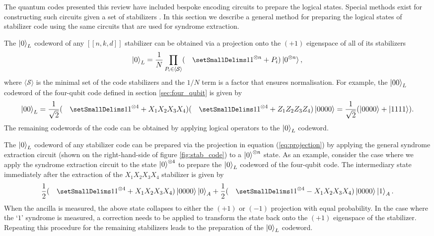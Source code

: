 \documentclass[]{arxiv}
\theoremstyle{plain}%
\theoremstyle{definition}
\theoremstyle{remark}
\DeclareRobustCommand\openone{\leavevmode\hbox{\small1\normalsize\kern-.33em1}}
\begin{document}
The quantum codes presented this review have included bespoke encoding circuits to prepare the logical states. Special methods exist for constructing such circuits given a set of stabilizers \cite{Gottesmanthesis,Roffe18}. In this section we describe a general method for preparing the logical states of stabilizer code using the same circuits that are used for syndrome extraction. 

The $\ket{0}_L$ codeword of any $[[n,k,d]]$ stabilizer can be obtained via a projection onto the $(+1)$ eigenspace of all of its stabilizers
%
\begin{equation}\label{eq:projection}
\ket{0}_L=\dfrac{1}{N}\prod_{P_i\in\langle \mathcal{S}\rangle}(\openone^{\otimes n} + P_i)\ket{0^{\otimes n}}\rm,
\end{equation}  
%
where $\langle \mathcal{S} \rangle$ is the minimal set of the code stabilizers and the $1/N$ term is a factor that ensures normalisation. For example, the $\ket{00}_L$ codeword of the four-qubit code defined in section \ref{sec:four_qubit} is given by
%
\begin{equation}
\ket{00}_L=\dfrac{1}{\sqrt{2}}(\openone^{\otimes 4} + X_1X_2X_3X_4)(\openone^{\otimes 4}+Z_1Z_2Z_3Z_4)\ket{0000}=\dfrac{1}{\sqrt{2}}(\ket{0000}+\ket{1111})\rm.
\end{equation}
%
The remaining codewords of the code can be obtained by applying logical operators to the $\ket{0}_L$ codeword.

The $\ket{0}_L$ codeword of any stabilizer code can be prepared via the projection in equation (\ref{eq:projection}) by applying the general syndrome extraction circuit (shown on the right-hand-side of figure \ref{fig:stab_code}) to a $\ket{0}^{\otimes n}$ state. As an example, consider the case where we apply the syndrome extraction circuit to the state $\ket{0}^{\otimes 4}$ to prepare the $\ket{0}_L$ codeword of the four-qubit code. The intermediary state immediately after the extraction of the $X_1X_2X_3X_4$ stabilizer is given by
%
\begin{equation}\label{eq:four_qubit_codeword}
\dfrac{1}{2}(\openone^{\otimes 4} + X_1X_2X_3X_4)\ket{0000}\ket{0}_A + \dfrac{1}{2}(\openone^{\otimes 4} - X_1X_2X_3X_4)\ket{0000}\ket{1}_A\rm.
\end{equation}
%
When the ancilla is measured, the above state collapses to either the $(+1)$ or $(-1)$ projection with equal probability. In the case where the `$1$' syndrome is measured, a correction needs to be applied to transform the state back onto the $(+1)$ eigenspace of the stabilizer. Repeating this procedure for the remaining stabilizers leads to the preparation of the $\ket{0}_L$ codeword.
\end{document}
